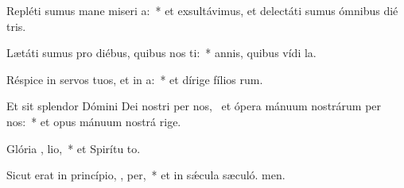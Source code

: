 \item Repléti sumus mane miseri a:~* et exsultávimus, et delectáti sumus ómnibus dié tris.
\item Lætáti sumus pro diébus, quibus nos ti:~* annis, quibus vídi la.
\item Réspice in servos tuos, et in  a:~* et dírige fílios rum.
\item Et sit splendor Dómini Dei nostri per nos,~\pscross{} et ópera mánuum nostrárum  per nos:~* et opus mánuum nostrá rige.
\item Glória ,  lio,~* et Spirítu to.
\item Sicut erat in princípio,  ,  per,~* et in sǽcula sæculó. men.
